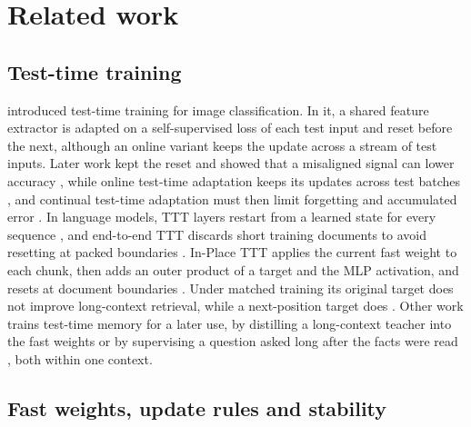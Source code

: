 \documentclass[10pt]{article} %
\begin{document}
\section{Related work}

\subsection{Test-time training}

\citet{sun2020ttt} introduced test-time training for image classification. In it, a shared feature extractor is adapted on a self-supervised loss of each test input and reset before the next, although an online variant keeps the update across a stream of test inputs. Later work kept the reset and showed that a misaligned signal can lower accuracy \citep{gandelsman2022ttt}, while online test-time adaptation keeps its updates across test batches \citep{wang2021tent}, and continual test-time adaptation must then limit forgetting and accumulated error \citep{wang2022cotta,maharana2026continual}. In language models, TTT layers restart from a learned state for every sequence \citep{sun2025learning}, and end-to-end TTT discards short training documents to avoid resetting at packed boundaries \citep{tandon2025endtoend}. In-Place TTT applies the current fast weight to each chunk, then adds an outer product of a target and the MLP activation, and resets at document boundaries \citep{feng2026inplace}. Under matched training its original target does not improve long-context retrieval, while a next-position target does \citep{ouyang2026ttt}. Other work trains test-time memory for a later use, by distilling a long-context teacher into the fast weights \citep{wang2026learning} or by supervising a question asked long after the facts were read \citep{kim2026delayed}, both within one context.

\subsection{Fast weights, update rules and stability}
\end{document}
